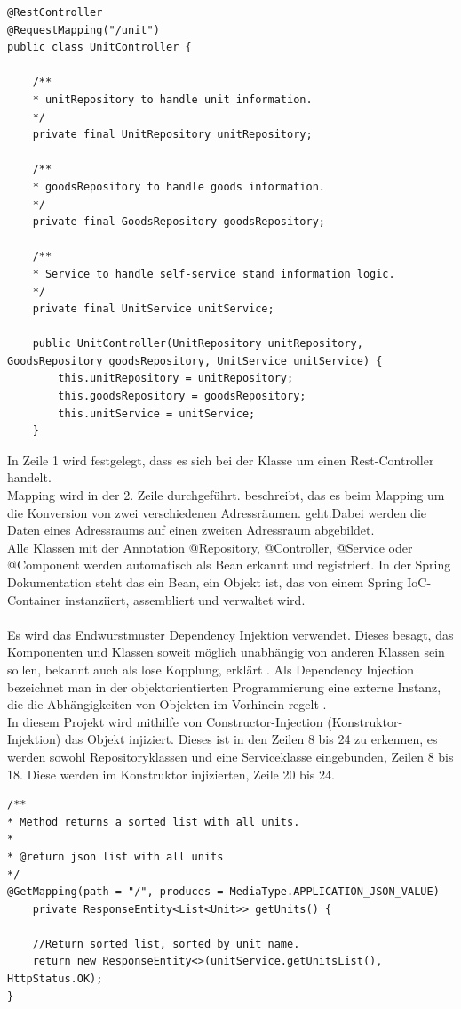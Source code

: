 \lstset{language=java}
\begin{lstlisting}[frame=tb, caption={Das Listing zeigt einen Ausschnitt aus der Klasse unitController}, label={lst:unitControllerAus}]
@RestController
@RequestMapping("/unit")
public class UnitController {
		
	/**
	* unitRepository to handle unit information.
	*/
	private final UnitRepository unitRepository;
	
	/**
	* goodsRepository to handle goods information.
	*/
	private final GoodsRepository goodsRepository;
	
	/**
	* Service to handle self-service stand information logic.
	*/
	private final UnitService unitService;
	
	public UnitController(UnitRepository unitRepository, GoodsRepository goodsRepository, UnitService unitService) {
		this.unitRepository = unitRepository;
		this.goodsRepository = goodsRepository;
		this.unitService = unitService;
	}
\end{lstlisting}

In Zeile 1 wird festgelegt, dass es sich bei der Klasse um einen Rest-Controller handelt. 
\\
Mapping wird in der 2. Zeile durchgeführt.\cite{mapping} beschreibt, das es beim Mapping \glqq um die Konversion von zwei verschiedenen Adressräumen.\glqq{} geht.\glqq Dabei werden die Daten eines Adressraums auf einen zweiten Adressraum abgebildet.\glqq{}
\\
Alle Klassen mit der Annotation @Repository, @Controller, @Service oder @Component werden automatisch als Bean erkannt und registriert. In der Spring Dokumentation \cite{spring} steht das ein Bean, ein Objekt ist, das von einem Spring IoC-Container instanziiert, assembliert und verwaltet wird.
\\
\\
Es wird das Endwurstmuster Dependency Injektion verwendet. Dieses besagt, das Komponenten und Klassen soweit möglich unabhängig von anderen Klassen sein sollen, bekannt auch als lose Kopplung, erklärt \cite{Dependency}.  \grqq Als Dependency Injection bezeichnet man in der objektorientierten Programmierung eine externe Instanz, die die Abhängigkeiten von Objekten im Vorhinein regelt \grqq{} \cite{Spring1}.
\\
In diesem Projekt wird mithilfe von Constructor-Injection (Konstruktor-Injektion) das Objekt injiziert. Dieses ist in den Zeilen 8 bis 24 zu erkennen, es werden sowohl Repositoryklassen und eine Serviceklasse eingebunden, Zeilen 8 bis 18. Diese werden im Konstruktor injizierten, Zeile 20 bis 24.
\\
\lstset{language=java}
\begin{lstlisting}[frame=tb, caption={Das Listing zeigt eine Methode aus der Klasse unitController}, label={lst:unitControllerAusM}]
/**
* Method returns a sorted list with all units.
*
* @return json list with all units
*/
@GetMapping(path = "/", produces = MediaType.APPLICATION_JSON_VALUE)
    private ResponseEntity<List<Unit>> getUnits() {
	
	//Return sorted list, sorted by unit name.
	return new ResponseEntity<>(unitService.getUnitsList(), HttpStatus.OK);
}
\end{lstlisting}

